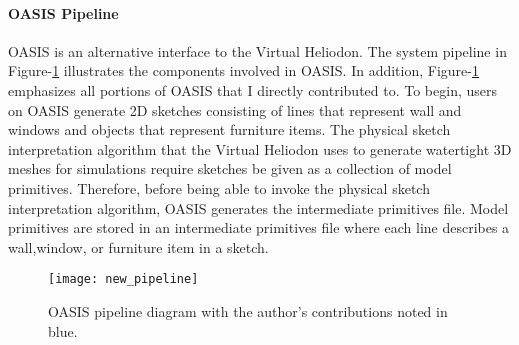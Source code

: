

\paragraph{OASIS Pipeline}
OASIS is an alternative interface to the Virtual Heliodon. 
The system pipeline in Figure-\ref{fig:new_pipeline} illustrates the components involved in OASIS.
In addition, Figure-\ref{fig:new_pipeline} emphasizes all portions of OASIS that I directly contributed to.
To begin, users on OASIS generate 2D sketches consisting of lines that represent wall and windows and objects that represent furniture items.  The physical sketch interpretation algorithm that the Virtual Heliodon uses to generate watertight 3D meshes for simulations require sketches be given as a collection of model primitives. 
Therefore, before being able to invoke the physical sketch interpretation algorithm, OASIS generates the intermediate primitives file.
Model primitives are stored in an intermediate primitives file where each line describes a wall,window, or furniture item in a sketch.\\

\begin{figure}[!ht]
\centering
\texttt{[image: new\_pipeline]}
\caption[Diagram of OASIS pipeline.]{OASIS pipeline diagram with the author's contributions noted in blue.}
\label{fig:new_pipeline}
\end{figure}

